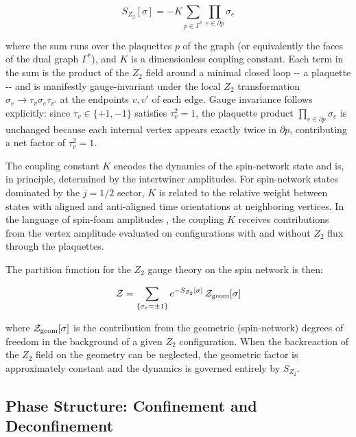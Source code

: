\begin{equation}\label{eqn:z2-gauge-action}
  S_{Z_2}[\sigma] = -K \sum_{p \in \Gamma^*} \prod_{e \in \partial p} \sigma_e
\end{equation}

where the sum runs over the plaquettes \(p\) of the graph (or equivalently the faces of the dual graph \(\Gamma^*\)), and \(K\) is a dimensionless coupling constant. Each term in the sum is the product of the \(Z_2\) field around a minimal closed loop -\/- a plaquette -\/- and is manifestly gauge-invariant under the local \(Z_2\) transformation \(\sigma_e \rightarrow \tau_v \sigma_e \tau_{v'}\) at the endpoints \(v, v'\) of each edge. Gauge invariance follows explicitly: since \(\tau_v \in \{+1,-1\}\) satisfies \(\tau_v^2 = 1\), the plaquette product \(\prod_{e \in \partial p} \sigma_e\) is unchanged because each internal vertex appears exactly twice in \(\partial p\), contributing a net factor of \(\tau_v^2 = 1\).

The coupling constant \(K\) encodes the dynamics of the spin-network state and is, in principle, determined by the intertwiner amplitudes. For spin-network states dominated by the \(j = 1/2\) sector, \(K\) is related to the relative weight between states with aligned and anti-aligned time orientations at neighboring vertices. In the language of spin-foam amplitudes \cite{Perez2013The-Spin-Foam,Dona2020Numerical,Dona2022Asymptotics}, the coupling \(K\) receives contributions from the vertex amplitude evaluated on configurations with and without \(Z_2\) flux through the plaquettes.

The partition function for the \(Z_2\) gauge theory on the spin network is then:

\begin{equation}\label{eqn:z2-partition-function}
  \mathcal{Z} = \sum_{\{\sigma_e = \pm 1\}} e^{-S_{Z_2}[\sigma]} \, \mathcal{Z}_{\text{geom}}[\sigma]
\end{equation}

where \(\mathcal{Z}_{\text{geom}}[\sigma]\) is the contribution from the geometric (spin-network) degrees of freedom in the background of a given \(Z_2\) configuration. When the backreaction of the \(Z_2\) field on the geometry can be neglected, the geometric factor is approximately constant and the dynamics is governed entirely by \(S_{Z_2}\).

\subsection{Phase Structure: Confinement and Deconfinement}\label{subsec:z2-phases}

